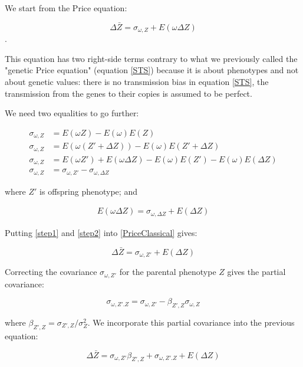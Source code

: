 We start from the Price equation:

\begin{equation}
\Delta \bar{Z} = \sigma_{\omega,Z}+E(\omega \Delta Z)
\label{PriceClassical}
\end{equation}.

This equation has two right-side terms contrary to what we previously called the "genetic Price equation" (equation \ref{STS}) because it is about phenotypes and not about genetic values: there is no transmission bias in equation \ref{STS}, the transmission from the genes to their copies is assumed to be perfect.

We need two equalities to go further:

\begin{align}
\sigma_{\omega,Z} &=E(\omega Z)-E(\omega)E(Z) \\
\sigma_{\omega,Z} &=E(\omega (Z'+\Delta Z))-E(\omega)E(Z'+\Delta Z) \\
\sigma_{\omega,Z} &=E(\omega Z')+E(\omega \Delta Z)-E(\omega)E(Z')-E(\omega)E(\Delta Z) \\
\sigma_{\omega,Z} &=\sigma_{\omega,Z'}-\sigma_{\omega, \Delta Z}
\label{step1}
\end{align}
 
 where $Z'$ is offspring phenotype; and
 
 \begin{align}
  E(\omega \Delta Z)=\sigma_{\omega,\Delta Z}+E(\Delta Z)
 \label{step2}
 \end{align}
 
 
Putting \ref{step1} and \ref{step2} into \ref{PriceClassical} gives:

\begin{equation}
\Delta \bar{Z}= \sigma_{\omega,Z'}+E(\Delta Z)
\end{equation}

Correcting the covariance $\sigma_{\omega,Z'}$ for the parental phenotype $Z$ gives the partial covariance:

\begin{equation}
\sigma_{\omega,Z' . Z}=\sigma_{\omega,Z'}-\beta_{Z',Z}\sigma_{\omega, Z}
\end{equation}

where $\beta_{Z',Z}=\sigma_{Z',Z}/\sigma_{Z}^2$. We incorporate this partial covariance into the previous equation:

\begin{equation}
\Delta \bar{Z}= \sigma_{\omega,Z'}\beta_{Z',Z}+\sigma_{\omega,Z'.Z}+E(\Delta Z)
\label{eqH8}
\end{equation}

